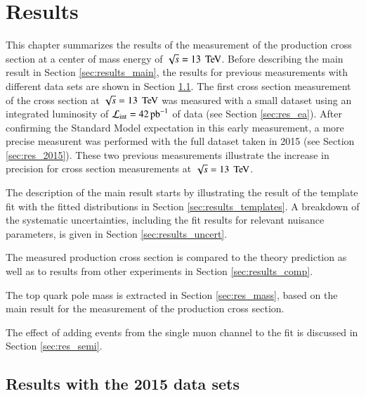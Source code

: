 
\chapter{Results}
\label{sec:res}

This chapter summarizes the results of the measurement of the \ttbar production cross section at a center of mass energy of $\sqrt{s} = 13 \; \,\text{Te\hspace{-.08em}V}$.
Before describing the main result in Section \ref{sec:results_main}, the results for  previous measurements with different data sets are shown
in Section \ref{sec:res_prev}. The first cross section measurement of the \ttbar cross section at $\sqrt{s}= 13 \; \,\text{Te\hspace{-.08em}V}$ was measured with a small dataset using an integrated luminosity of $\mathcal{L}_{\mathrm{int}}= 42 \mbox{\ensuremath{\,\text{pb}^\text{$-$1}}}$ 
of data (see Section \ref{sec:res_ea}). After confirming the Standard Model expectation in this early measurement, a more precise measurent was performed with the full dataset taken in 2015 (see Section \ref{sec:res_2015}).
These two previous measurements illustrate the increase in precision for \ttbar cross section measurements at $\sqrt{s} = 13 \; \,\text{Te\hspace{-.08em}V}$.

The description of the main result starts by illustrating the result of the template fit with the fitted distributions in Section \ref{sec:results_templates}.
A breakdown of the systematic uncertainties, including the fit results for relevant nuisance parameters, is given in Section \ref{sec:results_uncert}.

The measured \ttbar production cross section is compared to the theory prediction as well as to results from other experiments in Section \ref{sec:results_comp}.

The top quark pole mass is extracted in Section \ref{sec:res_mass}, based on the main result for the measurement of the \ttbar production cross section.

The effect of adding events from the single muon channel to the fit is discussed in Section \ref{sec:res_semi}.


\section{Results with the 2015 data sets}
\label{sec:res_prev}

